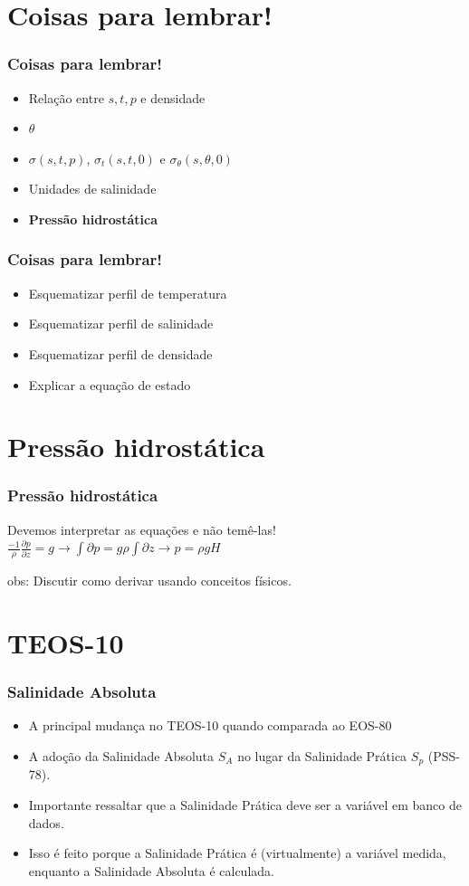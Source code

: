 \section{Coisas para lembrar!}
\begin{frame}
\frametitle{Coisas para lembrar!}
\begin{itemize}[<+-| alert@+>]
    \item Relação entre $s, t, p$ e densidade
    \item $\theta$
    \item $\sigma(s, t, p)$, $\sigma_t(s, t, 0)$ e
          $\sigma_{\theta}(s, \theta, 0)$
    \item Unidades de salinidade
    \item \bf{Pressão hidrostática}
\end{itemize}
\end{frame}

\begin{frame}
\frametitle{Coisas para lembrar!}
\begin{itemize}[<+-| alert@+>]
    \item Esquematizar perfil de temperatura
    \item Esquematizar perfil de salinidade
    \item Esquematizar perfil de densidade
    \item Explicar a equação de estado
\end{itemize}
\end{frame}

\section{Pressão hidrostática}
\begin{frame}
\frametitle{Pressão hidrostática}
    \begin{block}{Devemos interpretar as equações e não temê-las!}
    $\frac{-1}{\rho}\frac{\partial p}{\partial z} = g \rightarrow
    \int{\partial p} = g\rho \int{\partial z}
    \rightarrow p = \rho g H$
    \end{block}
    obs: Discutir como derivar usando conceitos físicos.
\end{frame}

\section{TEOS-10}
\begin{frame}
\frametitle{Salinidade Absoluta}
    \begin{itemize}[<+-| alert@+>]
        \item A principal mudança no TEOS-10 quando comparada ao EOS-80
        \item A adoção da Salinidade Absoluta $S_A$ no lugar da Salinidade
              Prática $S_p$ (PSS-78).
        \item Importante ressaltar que a Salinidade Prática deve ser a variável
              em banco de dados.
        \item Isso é feito porque a Salinidade Prática é (virtualmente) a
              variável medida, enquanto a Salinidade Absoluta é calculada.
    \end{itemize}
\end{frame}

